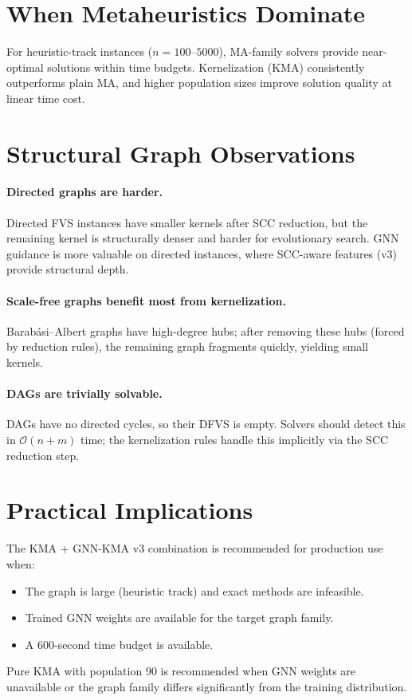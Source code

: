 \documentclass[10pt,a4paper]{report}
\theoremstyle{definition}
\newcommand{\bigO}[1]{\mathcal{O}\!\left(#1\right)}
\begin{document}
\section{When Metaheuristics Dominate}

For heuristic-track instances ($n = 100$--$5000$), MA-family solvers provide near-optimal solutions within time budgets. Kernelization (KMA) consistently outperforms plain MA, and higher population sizes improve solution quality at linear time cost.

\section{Structural Graph Observations}

\paragraph{Directed graphs are harder.} Directed FVS instances have smaller kernels after SCC reduction, but the remaining kernel is structurally denser and harder for evolutionary search. GNN guidance is more valuable on directed instances, where SCC-aware features (v3) provide structural depth.

\paragraph{Scale-free graphs benefit most from kernelization.} Barab\'{a}si--Albert graphs have high-degree hubs; after removing these hubs (forced by reduction rules), the remaining graph fragments quickly, yielding small kernels.

\paragraph{DAGs are trivially solvable.} DAGs have no directed cycles, so their DFVS is empty. Solvers should detect this in $\bigO{n + m}$ time; the kernelization rules handle this implicitly via the SCC reduction step.

\section{Practical Implications}

The KMA + GNN-KMA v3 combination is recommended for production use when:
\begin{itemize}
	\item The graph is large (heuristic track) and exact methods are infeasible.
	\item Trained GNN weights are available for the target graph family.
	\item A 600-second time budget is available.
\end{itemize}
Pure KMA with population 90 is recommended when GNN weights are unavailable or the graph family differs significantly from the training distribution.
\end{document}

